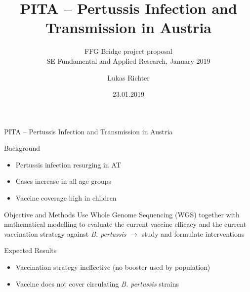 \documentclass{beamer}\usepackage[]{graphicx}\usepackage[]{color}
\let\otp\titlepage
\renewcommand{\titlepage}{\otp\addtocounter{framenumber}{-1}}
\begin{document}
\title{PITA -- Pertussis Infection and Transmission in Austria}
\subtitle{FFG Bridge project proposal\\
SE Fundamental and Applied Research, January 2019}
\author{Lukas Richter}
\date[]{23.01.2019} %

\begin{frame}[plain]
 \titlepage
\end{frame}

\begin{frame}[fragile]{\scriptsize{PITA -- Pertussis Infection and Transmission in Austria}}
\begin{center}

\begin{block}{Background}
\begin{itemize}
  \item Pertussis infection resurging in AT
  \item Cases increase in all age groups
  \item Vaccine coverage high in children
\end{itemize}
\end{block}

\begin{block}{Objective and Methods}
Use Whole Genome Sequencing (WGS) together with mathematical modelling to evaluate the current vaccine efficacy and the current vaccination strategy against \textit{B. pertussis} $\rightarrow$ study and formulate interventions
\end{block}

\begin{block}{Expected Results}
\begin{itemize}
  \item Vaccination strategy ineffective (no booster used by population)
  \item Vaccine does not cover circulating \textit{B. pertussis} strains
\end{itemize}
\end{block}


\end{center}
\end{frame}
\end{document}
